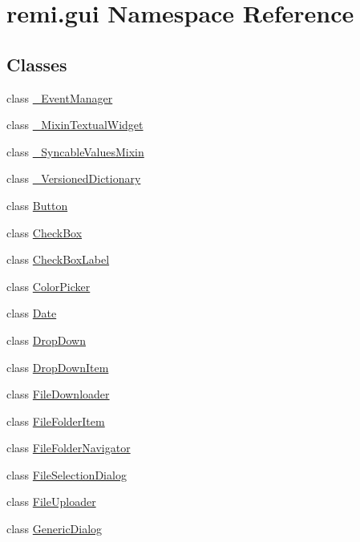 \hypertarget{namespaceremi_1_1gui}{}\section{remi.\+gui Namespace Reference}
\label{namespaceremi_1_1gui}
\subsection*{Classes}
\begin{DoxyCompactItemize}
\item 
class \hyperlink{classremi_1_1gui_1_1__EventManager}{\+\_\+\+Event\+Manager}
\item 
class \hyperlink{classremi_1_1gui_1_1__MixinTextualWidget}{\+\_\+\+Mixin\+Textual\+Widget}
\item 
class \hyperlink{classremi_1_1gui_1_1__SyncableValuesMixin}{\+\_\+\+Syncable\+Values\+Mixin}
\item 
class \hyperlink{classremi_1_1gui_1_1__VersionedDictionary}{\+\_\+\+Versioned\+Dictionary}
\item 
class \hyperlink{classremi_1_1gui_1_1Button}{Button}
\item 
class \hyperlink{classremi_1_1gui_1_1CheckBox}{Check\+Box}
\item 
class \hyperlink{classremi_1_1gui_1_1CheckBoxLabel}{Check\+Box\+Label}
\item 
class \hyperlink{classremi_1_1gui_1_1ColorPicker}{Color\+Picker}
\item 
class \hyperlink{classremi_1_1gui_1_1Date}{Date}
\item 
class \hyperlink{classremi_1_1gui_1_1DropDown}{Drop\+Down}
\item 
class \hyperlink{classremi_1_1gui_1_1DropDownItem}{Drop\+Down\+Item}
\item 
class \hyperlink{classremi_1_1gui_1_1FileDownloader}{File\+Downloader}
\item 
class \hyperlink{classremi_1_1gui_1_1FileFolderItem}{File\+Folder\+Item}
\item 
class \hyperlink{classremi_1_1gui_1_1FileFolderNavigator}{File\+Folder\+Navigator}
\item 
class \hyperlink{classremi_1_1gui_1_1FileSelectionDialog}{File\+Selection\+Dialog}
\item 
class \hyperlink{classremi_1_1gui_1_1FileUploader}{File\+Uploader}
\item 
class \hyperlink{classremi_1_1gui_1_1GenericDialog}{Generic\+Dialog}
\item 

\end{DoxyCompactItemize}

